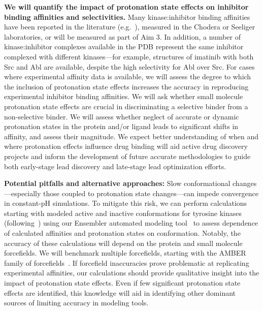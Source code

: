 \documentclass[11pt]{article}
\begin{document}
{\bf We will quantify the impact of protonation state effects on inhibitor binding affinities and selectivities.}
Many kinase:inhibitor binding affinities have been reported in the literature (e.g.~\cite{bain:biochem-j:2007:kinase-inhibitor-selectivity,fabian:nature-biotech:2005:kinase-selectivity-map,karaman:nature-biotech:2008:kinase-selectivity-map}), measured in the Chodera or Seeliger laboratories, or will be measured as part of Aim 3.
In addition, a number of kinase:inhibitor complexes available in the PDB represent the same inhibitor complexed with different kinases---for example, structures of imatinib with both Src and Abl are available, despite the high selectivity for Abl over Src.
For cases where experimental affinity data is available, we will assess the degree to which the inclusion of protonation state effects increases the accuracy in reproducing experimental inhibitor binding affinities.
We will ask whether small molecule protonation state effects are crucial in discriminating a selective binder from a non-selective binder.  
We will assess whether neglect of accurate or dynamic protonation states in the protein and/or ligand leads to  significant shifts in affinity, and assess their magnitude.
We expect better understanding of when and where protonation effects influence drug binding will  aid active drug discovery projects and inform the development of future accurate methodologies to guide both early-stage lead discovery and late-stage lead optimization efforts.

{\bf Potential pitfalls and alternative approaches:}
Slow conformational changes---especially those coupled to protonation state changes---can impede convergence in constant-pH simulations.
To mitigate this risk, we can perform calculations starting with modeled active and inactive conformations for tyrosine kinases (following~\cite{roux:pnas:2013:gleevec-selectivity}) using our Ensembler automated modeling tool~\cite{chodera:plos-comp-bio:2016:ensembler} to assess dependence of calculated affinities and protonation states on conformation. 
Notably, the accuracy of these calculations will depend on the protein and small molecule forcefields.
We will benchmark multiple forcefields, starting with the AMBER family of forcefields~\cite{forcefields-note}.
If forcefield inaccuracies prove problematic at replicating experimental affinities, our calculations should provide qualitative insight into the impact of protonation state effects.
Even if few significant protonation state effects are identified, this knowledge will aid in identifying other dominant sources of limiting accuracy in modeling tools.
\end{document}
